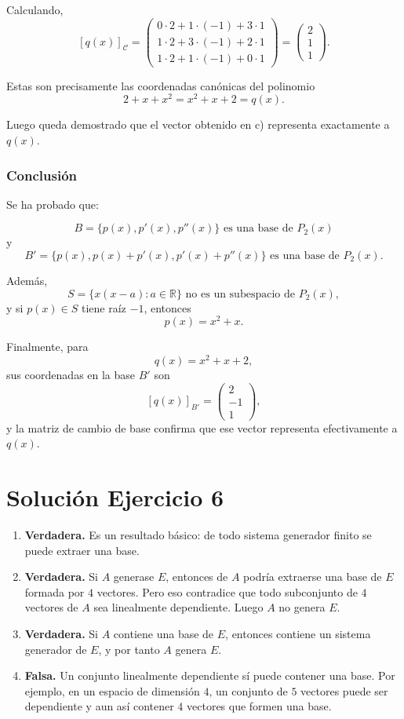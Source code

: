 \documentclass[12pt]{article}
\begin{document}
Calculando,
\[
[q(x)]_{\mathcal C}
=
\begin{pmatrix}
0\cdot 2+1\cdot(-1)+3\cdot 1\\
1\cdot 2+3\cdot(-1)+2\cdot 1\\
1\cdot 2+1\cdot(-1)+0\cdot 1
\end{pmatrix}
=
\begin{pmatrix}
2\\
1\\
1
\end{pmatrix}.
\]

Estas son precisamente las coordenadas canónicas del polinomio
\[
2+x+x^2=x^2+x+2=q(x).
\]

Luego queda demostrado que el vector obtenido en c) representa exactamente a \(q(x)\).

\subsubsection*{Conclusión}

Se ha probado que:

\[
\boxed{B=\{p(x),p'(x),p''(x)\}\text{ es una base de }P_2(x)}
\]
y
\[
\boxed{B'=\{p(x),p(x)+p'(x),p'(x)+p''(x)\}\text{ es una base de }P_2(x).}
\]

Además,
\[
\boxed{S=\{x(x-a):a\in\mathbb{R}\}\text{ no es un subespacio de }P_2(x),}
\]
y si \(p(x)\in S\) tiene raíz \(-1\), entonces
\[
p(x)=x^2+x.
\]

Finalmente, para
\[
q(x)=x^2+x+2,
\]
sus coordenadas en la base \(B'\) son
\[
\boxed{
[q(x)]_{B'}=
\begin{pmatrix}
2\\
-1\\
1
\end{pmatrix},}
\]
y la matriz de cambio de base confirma que ese vector representa efectivamente a \(q(x)\).

\section*{Solución Ejercicio 6}
\begin{enumerate}
    \item \textbf{Verdadera.}  
    Es un resultado básico: de todo sistema generador finito se puede extraer una base.

    \item \textbf{Verdadera.}  
    Si \(A\) generase \(E\), entonces de \(A\) podría extraerse una base de \(E\) formada por \(4\) vectores. Pero eso contradice que todo subconjunto de \(4\) vectores de \(A\) sea linealmente dependiente. Luego \(A\) no genera \(E\).

    \item \textbf{Verdadera.}  
    Si \(A\) contiene una base de \(E\), entonces contiene un sistema generador de \(E\), y por tanto \(A\) genera \(E\).

    \item \textbf{Falsa.}  
    Un conjunto linealmente dependiente sí puede contener una base. Por ejemplo, en un espacio de dimensión \(4\), un conjunto de \(5\) vectores puede ser dependiente y aun así contener \(4\) vectores que formen una base.
\end{enumerate}
\end{document}
